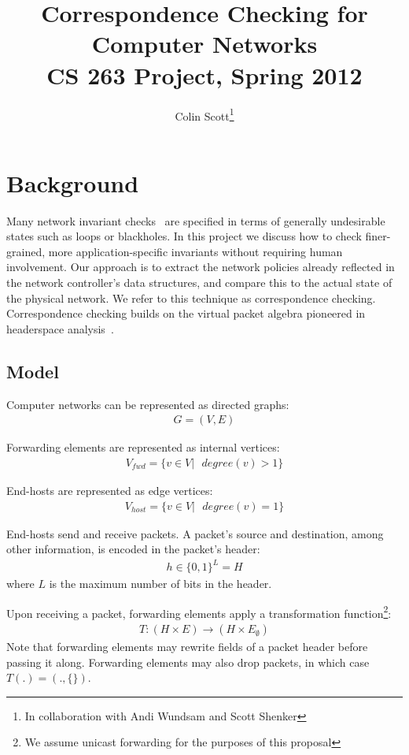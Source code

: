 \documentclass{sig-alternate-10pt}
\title{Correspondence Checking for Computer Networks \\
\Large{CS 263 Project, Spring 2012 \vspace{-25pt}}}
\author{Colin Scott\thanks{In collaboration with Andi
Wundsam and Scott Shenker}\vspace{-15pt}}
\date{}
\begin{document}
    \maketitle
    \thispagestyle{empty}
\section{Background}

Many network invariant checks~\cite{HeaderSpace, Anteater} are specified in
terms of generally undesirable
states such as loops or blackholes.
In this project we discuss how to check finer-grained,
more application-specific
invariants without requiring human involvement.
Our approach is to extract the network policies already reflected in the
network controller's data structures, and compare this to the actual state of
the physical network.
We refer to this technique as correspondence checking. Correspondence checking
builds on the virtual packet algebra
pioneered in headerspace analysis~\cite{HeaderSpace}.

\subsection{Model}

Computer networks can be represented as directed graphs:
\begin{align*}
G = (V, E)
\end{align*}

Forwarding elements are represented as internal vertices:
\begin{align*}
V_{fwd} = \{ v \in V |\text{ } degree(v) > 1 \}
\end{align*}

End-hosts are represented as edge vertices:
\begin{align*}
V_{host} = \{ v \in V |\text{ } degree(v) = 1 \}
\end{align*}

End-hosts send and receive packets. A packet's source and destination,
among other information, is encoded in the packet's header:
\begin{align*}
h \in \{0,1\}^L = H
\end{align*}
where $L$ is the maximum number of bits in
the header.

Upon receiving a packet, forwarding elements apply a transformation
function\footnote{We assume unicast forwarding for the purposes of this proposal}:
\begin{align*}
T: (H \times E) \rightarrow (H \times E_{\emptyset})
\end{align*}
Note that forwarding elements may rewrite fields of a packet header before passing it along.
Forwarding elements may also drop packets, in which case $T(.) = (.,\{\})$.
\end{document}
